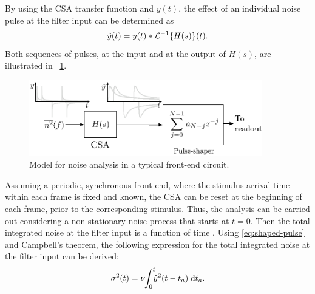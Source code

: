 By using the CSA transfer function and $y(t)$, the effect of an individual noise pulse at the filter input can be determined as
\begin{equation}
\hat{y}(t) = y(t) \ast \mathcal{L}^{-1}\!\left\{ H(s)\right\}\hspace{-0.15em}(t).\label{eq:shaped-pulse}
\end{equation}
Both sequences of pulses, at the input and at the output of $H(s)$, are illustrated in \figurename~\ref{fig:system}.

\begin{figure}[!t]
	\centering
	\includegraphics[width=4in]{./Figures/system.eps}
	\caption{Model for noise analysis in a typical \mbox{front-end} circuit.}\label{fig:system}
\end{figure}

Assuming a periodic, synchronous \mbox{front-end}, where the stimulus arrival time within each frame is fixed and known, the CSA can be reset at the beginning of each frame, prior to the corresponding stimulus. Thus, the analysis can be carried out considering a non-stationary noise process that starts at $t=0$. Then the total integrated noise at the filter input is a function of time \citep{radeka201}. Using \eqref{eq:shaped-pulse} and Campbell's theorem, the following expression for the total integrated noise at the filter input can be derived:
\begin{equation}
\sigma^2(t) = \nu\hspace{-.25em}\int_{0}^{t}\hspace{-.45em}\hat {y}^2(t-t_a)\;\mathrm{d}t_a\label{eq:envelope}.
\end{equation}

